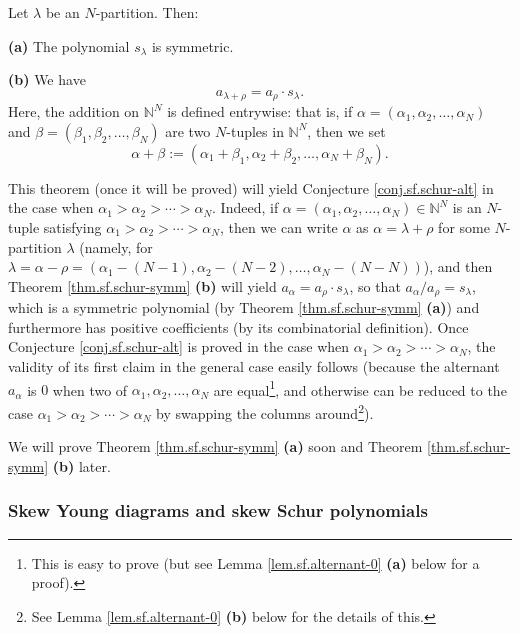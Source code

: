 \begin{theorem}
\label{thm.sf.schur-symm}Let $\lambda$ be an $N$-partition. Then:\medskip

\textbf{(a)} The polynomial $s_{\lambda}$ is symmetric. \medskip

\textbf{(b)} We have
\[
a_{\lambda+\rho}=a_{\rho}\cdot s_{\lambda}.
\]
Here, the addition on $\mathbb{N}^{N}$ is defined entrywise: that is, if
$\alpha=\left(  \alpha_{1},\alpha_{2},\ldots,\alpha_{N}\right)  $ and
$\beta=\left(  \beta_{1},\beta_{2},\ldots,\beta_{N}\right)  $ are two
$N$-tuples in $\mathbb{N}^{N}$, then we set%
\[
\alpha+\beta:=\left(  \alpha_{1}+\beta_{1},\alpha_{2}+\beta_{2},\ldots
,\alpha_{N}+\beta_{N}\right)  .
\]

\end{theorem}

This theorem (once it will be proved) will yield Conjecture
\ref{conj.sf.schur-alt} in the case when $\alpha_{1}>\alpha_{2}>\cdots
>\alpha_{N}$. Indeed, if $\alpha=\left(  \alpha_{1},\alpha_{2},\ldots
,\alpha_{N}\right)  \in\mathbb{N}^{N}$ is an $N$-tuple satisfying $\alpha
_{1}>\alpha_{2}>\cdots>\alpha_{N}$, then we can write $\alpha$ as
$\alpha=\lambda+\rho$ for some $N$-partition $\lambda$ (namely, for
$\lambda=\alpha-\rho=\left(  \alpha_{1}-\left(  N-1\right)  ,\alpha
_{2}-\left(  N-2\right)  ,\ldots,\alpha_{N}-\left(  N-N\right)  \right)  $),
and then Theorem \ref{thm.sf.schur-symm} \textbf{(b)} will yield $a_{\alpha
}=a_{\rho}\cdot s_{\lambda}$, so that $a_{\alpha}/a_{\rho}=s_{\lambda}$, which
is a symmetric polynomial (by Theorem \ref{thm.sf.schur-symm} \textbf{(a)})
and furthermore has positive coefficients (by its combinatorial definition).
Once Conjecture \ref{conj.sf.schur-alt} is proved in the case when $\alpha
_{1}>\alpha_{2}>\cdots>\alpha_{N}$, the validity of its first claim in the
general case easily follows (because the alternant $a_{\alpha}$ is $0$ when
two of $\alpha_{1},\alpha_{2},\ldots,\alpha_{N}$ are equal\footnote{This is
easy to prove (but see Lemma \ref{lem.sf.alternant-0} \textbf{(a)} below for a
proof).}, and otherwise can be reduced to the case $\alpha_{1}>\alpha
_{2}>\cdots>\alpha_{N}$ by swapping the columns around\footnote{See Lemma
\ref{lem.sf.alternant-0} \textbf{(b)} below for the details of this.}).

We will prove Theorem \ref{thm.sf.schur-symm} \textbf{(a)} soon and Theorem
\ref{thm.sf.schur-symm} \textbf{(b)} later.

\subsubsection{Skew Young diagrams and skew Schur polynomials}

